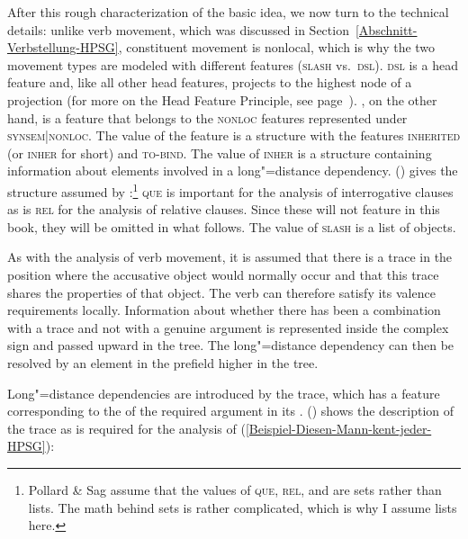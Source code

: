 \largerpage
\noindent
After this rough characterization of the basic idea, we now turn to the technical details: unlike verb
movement, which was discussed in Section~\ref{Abschnitt-Verbstellung-HPSG}, constituent movement is
nonlocal, which is why the two movement types are modeled with different features (\textsc{slash} vs.\ \textsc{dsl}).
\textsc{dsl} is a head feature and, like all other head features, projects to the highest node of a projection (for more on the Head Feature Principle,
see page~\pageref{prinzip-hfp}). \slasch, on the other hand, is a feature that belongs to the \textsc{nonloc} features represented under \textsc{synsem|nonloc}. The value of the \nonloc feature is a structure with the features \textsc{inherited} (or \textsc{inher} for short) and 
\textsc{to-bind}. The value of \textsc{inher} is a structure containing information about elements involved in a long"=distance dependency.
() gives the structure assumed by \citet[]{ps2}:\footnote{%
  Pollard \& Sag assume that the values of \textsc{que}, \textsc{rel}, and \slasch are sets rather
  than lists. The math behind sets is rather complicated, which is why I assume lists here.
}
\ea
{}
\z
\textsc{que} is important for the analysis of interrogative clauses as is \textsc{rel} for the analysis of relative
clauses. Since these will not feature in this book, they will be omitted in what follows. The value of \textsc{slash}
is a list of  objects.

As with the analysis of verb movement, it is assumed that there is a
trace in the position where the accusative object would normally occur and that this trace shares the properties of that object. The verb can therefore satisfy its valence requirements locally. Information about whether
there has been a combination with a trace and not with a genuine argument is represented inside the complex sign and passed upward in the tree.
The long"=distance dependency can then be resolved by an element in the prefield higher in the tree.

Long"=distance dependencies are introduced by the trace, which has a feature corresponding to the \localv of the required argument in its \slashl.
() shows the description of the trace as is required for the analysis of (\ref{Beispiel-Diesen-Mann-kent-jeder-HPSG}):


